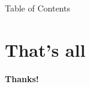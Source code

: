 


  
 

 \maketitle
 
 \begin{frame}{Table of Contents}
 \begin{multicols}{2} %
\tableofcontents
\end{multicols}
 \end{frame}


\section*{That's all} %
\begin{frame}
\label{sec:that_s_all}
  \centering\Huge \textbf {Thanks!}
	
\end{frame}




